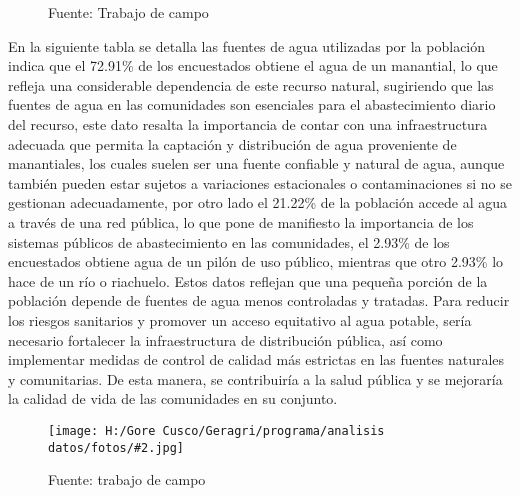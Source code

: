 \documentclass{article}\usepackage[]{graphicx}\usepackage[table]{xcolor}
\makeatletter
\newenvironment{kframe}{%
 \def\at@end@of@kframe{}%
 \ifinner\ifhmode%
  \def\at@end@of@kframe{\end{minipage}}%
  \begin{minipage}{\columnwidth}%
 \fi\fi%
 \def\FrameCommand##1{\hskip\@totalleftmargin \hskip-\fboxsep
 \colorbox{shadecolor}{##1}\hskip-\fboxsep
     \hskip-\linewidth \hskip-\@totalleftmargin \hskip\columnwidth}%
 \MakeFramed {\advance\hsize-\width
   \@totalleftmargin\z@ \linewidth\hsize
   \@setminipage}}%
 {\par\unskip\endMakeFramed%
 \at@end@of@kframe}
\newenvironment{knitrout}{}{} %
\newenvironment{fotos}[2]
{\begin{figure}[H]
	\centering
	\caption{#1}
	\texttt{[image: H:/Gore Cusco/Geragri/programa/analisis datos/fotos/\#2.jpg]}
	\caption*{Fuente: trabajo de campo}}
{\end{figure}}
\makeatother
\begin{document}
\begin{figure}[H]
  \centering
  \caption{Fuente de agua}
\begin{knitrout}
\color{fgcolor}\begin{kframe}


{\ttfamily\noindent\bfseries{}}

{\ttfamily\noindent{}}

{\ttfamily\noindent\bfseries{}}

{\ttfamily\noindent\bfseries\color{errorcolor}{\#\# Error: objeto 'datos' no encontrado}}

{\ttfamily\noindent\bfseries\color{errorcolor}{\#\# Error: objeto 'datos' no encontrado}}

{\ttfamily\noindent\bfseries\color{errorcolor}{\#\# Error: objeto 'datos' no encontrado}}

{\ttfamily\noindent\bfseries\color{errorcolor}{\#\# Error: objeto 'graph1' no encontrado}}\end{kframe}
\end{knitrout}
  \caption*{Fuente: Trabajo de campo}
\end{figure}
En la siguiente tabla se detalla las fuentes de agua utilizadas por la población indica  que el 72.91\% de los encuestados obtiene el agua de un manantial, lo que refleja una considerable dependencia de este recurso natural, sugiriendo que las fuentes de agua en las comunidades son esenciales para el abastecimiento diario del recurso, este dato resalta la importancia de contar con una infraestructura adecuada que permita la captación y distribución de agua proveniente de manantiales, los cuales suelen ser una fuente confiable y natural de agua, aunque también pueden estar sujetos a variaciones estacionales o contaminaciones si no se gestionan adecuadamente, por otro lado el 21.22\% de la población accede al agua a través de una red pública, lo que pone de manifiesto la importancia de los sistemas públicos de abastecimiento en las comunidades, el 2.93\% de los encuestados obtiene agua de un pilón de uso público, mientras que otro 2.93\% lo hace de un río o riachuelo. Estos datos reflejan que una pequeña porción de la población depende de fuentes de agua menos controladas y tratadas. Para reducir los riesgos sanitarios y promover un acceso equitativo al agua potable, sería necesario fortalecer la infraestructura de distribución pública, así como implementar medidas de control de calidad más estrictas en las fuentes naturales y comunitarias. De esta manera, se contribuiría a la salud pública y se mejoraría la calidad de vida de las comunidades en su conjunto.
\begin{fotos}
{sensibilizacion a la poblacion}{9}
\end{fotos}
\end{document}
